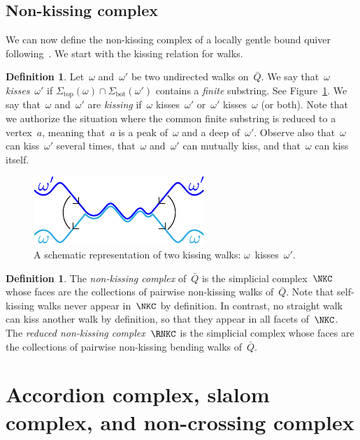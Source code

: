 \documentclass{amsart}
\theoremstyle{definition}
\newtheorem{definition}[theorem]{Definition}
\newcommand{\fref}[1]{Figure~\ref{#1}} %
\newcommand{\darkblue}{\color{darkblue}} %
\newcommand{\defn}[1]{\textsl{\darkblue #1}} %
\renewcommand{\top}{\mathrm{top}} %
\newcommand{\bottom}{\mathrm{bot}} %
\begin{document}
\subsection{Non-kissing complex}

We can now define the non-kissing complex of a locally gentle bound quiver following~\cite{McConville, PaluPilaudPlamondon, BrustleDouvilleMousavandThomasYildirim}.
We start with the kissing relation for walks.

\begin{definition}
\label{def:kiss}
Let~$\omega$ and~$\omega'$ be two undirected walks on~$\bar Q$.
We say that~$\omega$ \defn{kisses}~$\omega'$ if ${\Sigma_\top(\omega) \cap \Sigma_\bottom(\omega')}$ contains a \emph{finite} substring.
See \fref{fig:kissing}.
We say that~$\omega$ and~$\omega'$ are \defn{kissing} if~$\omega$ kisses~$\omega'$ or~$\omega'$ kisses~$\omega$ (or both).
Note that we authorize the situation where the common finite substring is reduced to a vertex~$a$, meaning that~$a$ is a peak of~$\omega$ and a deep of~$\omega'$.
Observe also that~$\omega$ can kiss~$\omega'$ several times, that~$\omega$ and~$\omega'$ can mutually kiss, and that~$\omega$ can kiss itself.
%
\begin{figure}[h]
	\capstart
	\centerline{\includegraphics[scale=1]{kissing}}
	\caption{A schematic representation of two kissing walks: $\omega$~kisses~$\omega'$.}
	\label{fig:kissing}
\end{figure}
%
\end{definition}

\begin{definition}
\label{def:nKc}
The \defn{non-kissing complex} of~$\bar Q$ is the simplicial complex~$\NKC$ whose faces are the collections of pairwise non-kissing walks of~$\bar Q$.
Note that self-kissing walks never appear in~$\NKC$ by definition.
In contrast, no straight walk can kiss another walk by definition, so that they appear in all facets of~$\NKC$.
The \defn{reduced non-kissing complex}~$\RNKC$ is the simplicial complex whose faces are the collections of pairwise non-kissing bending walks of~$\bar Q$.
\end{definition}

\section{Accordion complex, slalom complex, and non-crossing complex}\label{sec:accordionSlalomNonCrossingComplexes}
\end{document}
